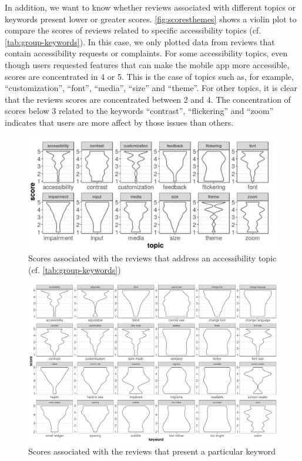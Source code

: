 In addition, we want to know whether reviews associated with different topics or keywords present lower or greater scores. 
\autoref{fig:scoresthemes} shows a violin plot to compare the scores of reviews related to specific accessibility topics (cf. \autoref{tab:group-keywords}). In this case, we only plotted data from reviews that contain accessibility requests or complaints. For some accessibility topics, even though users requested features that can make the mobile app more accessible, scores are concentrated in 4 or 5. This is the case of topics such as, for example, ``customization'', ``font'', ``media'', ``size'' and ``theme''. For other topics, it is clear that the reviews scores are concentrated between 2 and 4. The concentration of scores below 3 related to the keywords ``contrast'', ``flickering'' and ``zoom'' indicates that users are more affect by those issues than others.

 \begin{figure}[!htb]
 \centering
\includegraphics[scale=0.57]{imagens/score-themes-adapt.pdf}
\caption{Scores associated with the reviews that address an accessibility topic (cf. \autoref{tab:group-keywords})}
\label{fig:scoresthemes}
\end{figure}

 \begin{figure}[!htb]
 \centering
\includegraphics[scale=0.42]{imagens/keywords-scores.pdf}
\caption{Scores associated with the reviews that present a particular keyword}
\label{fig:scoreskeys}
\end{figure}

